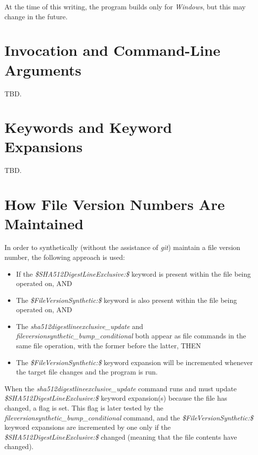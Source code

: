 \documentclass[letterpaper,10pt,titlepage]{article}
\begin{document}
At the time of this writing, the program builds only for \emph{Windows}, but
this may change in the future.
  
\section{Invocation and Command-Line Arguments}
\label{sicl0}

TBD.

\section{Keywords and Keyword Expansions}
\label{skwe0}

TBD.

\section{How File Version Numbers Are Maintained}
\label{shfv0}

In order to synthetically (without the assistance of \emph{git}) maintain a
file version number, the following approach is used:

\begin{itemize}
\item If the \emph{\$SHA512DigestLineExclusive:\$} keyword is present within the file
      being operated on, AND
\item The \emph{\$FileVersionSynthetic:\$} keyword is also present within the
      file being operated on, AND
\item The \emph{sha512digestlineexclusive\_update} and \\
      \emph{fileversionsynthetic\_bump\_conditional} both appear as file
      commands in the same file operation, with the former before the latter, THEN
\item The \emph{\$FileVersionSynthetic:\$} keyword expansion will be incremented
      whenever the target file changes and the program is run.
\end{itemize}

When the \emph{sha512digestlineexclusive\_update} command runs and must update
\emph{\$SHA512DigestLineExclusive:\$} keyword expansion(s) because the file
has changed, a flag is set.  This flag is later tested by the
\emph{fileversionsynthetic\_bump\_conditional} command, and the
\emph{\$FileVersionSynthetic:\$} keyword expansions are incremented by one
only if the \emph{\$SHA512DigestLineExclusive:\$} changed (meaning that the
file contents have changed).
\end{document}
